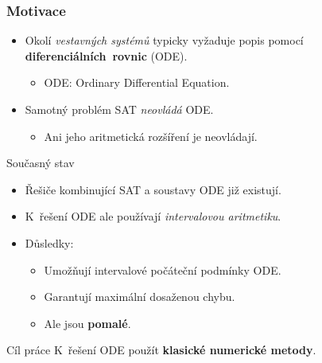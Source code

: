 \documentclass[t]{beamer}
\begin{document}
\begin{frame}\frametitle{Motivace}
\begin{itemize}
\item Okolí \textit{vestavných systémů} typicky vyžaduje popis
   pomocí \textbf{diferenciálních~rovnic} (ODE).
   \begin{itemize}
   \item ODE: Ordinary Differential Equation.
   \end{itemize}
\item Samotný problém SAT \textit{neovládá} ODE.
   \begin{itemize}
   \item Ani jeho aritmetická rozšíření je neovládají.
   \end{itemize}
\end{itemize}

\begin{block}{Současný stav}
\begin{itemize}
\item Řešiče kombinující SAT a soustavy ODE již existují.
\item K~řešení ODE ale používají \textit{intervalovou aritmetiku}.
\item Důsledky:
   \begin{itemize}
   \item Umožňují intervalové počáteční podmínky ODE.
   \item Garantují maximální dosaženou chybu.
   \item Ale jsou \textbf{pomalé}.
   \end{itemize}
\end{itemize}
\end{block} %

\vfill

\begin{exampleblock}{Cíl práce}\centering
K~řešení ODE použít \textbf{klasické numerické metody}.
\end{exampleblock} %
\end{frame}

\end{document}
